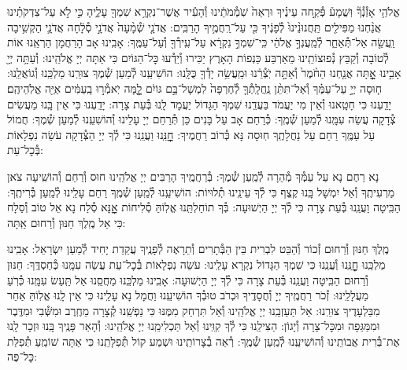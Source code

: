 \documentclass[twoside, openany, parskip=half, 11pt]{book}
\begin{document}
אֱלֹהַ֥י אָזְ֯נְ֯ךָ֘ וּֽשֲׁמָע֒ פְּ֯קַ֣חה עֵינֶ֗יךָ וּרְאֵה֙ שֹֽׁמְ֯מֹתֵ֔ינוּ וְ֯הָעִ֕יר אֲשֶׁר־נִקְרָ֥א שִׁמְךָ֖ עָלֶ֑יהָ כִּ֣י לֹ֣א עַל־צִדְקֹתֵ֗ינוּ אֲנַ֨חְנוּ מַפִּילִ֤ים תַּֽחֲנוּנֵ֨ינוּ֙ לְ֯פָנֶ֔יךָ כִּ֖י עַל־רַֽחֲמֶ֥יךָ הָרַבִּֽים: אֲדֹנָ֤י שְׁ֯מָ֨עָה֙ אֲדֹנָ֣י סְ֯לָ֔חָה אֲדֹנָ֛י הַקְשִׁ֥יבָה וַֽעֲשֵׂ֖ה אַל־תְּ֯אַחַ֑ר לְ֯מַֽעֲנְךָ֣ אֱלֹהַ֔י כִּֽי־שִׁמְךָ֣ נִקְרָ֔א עַל־עִֽירְ֯ךָ֖ וְ֯עַל־עַמֶּֽךָ: אָבִֽינוּ אָב הָרַחֲמָן הַרְאֵֽנוּ אוֹת לְ֯טוֹבָה וְ֯קַבֵּץ נְ֯פוּצוֹתֵֽינוּ מֵאַרְבַּע כַּנְפוֹת הָאָרֶץ יַכִּירוּ וְ֯יֵדְ֯עוּ כׇּל־הַגּוֹיִם כִּי אַתָּה יְיָ אֱלֹהֵֽינוּ:
וְ֯עַתָּ֥ה יְיָ֖ אָבִ֣ינוּ אׇׇׇׇׇׇֽתָּה אֲנַ֤חְנוּ הַחֹ֨מֶר֙ וְ֯אַתָּ֣ה יֹֽצְ֯רֵ֔נוּ וּמַֽעֲשֵׂ֥ה יָדְ֯ךָ֖ כֻּלָּֽנוּ: הוֹשִׁיעֵֽנוּ לְ֯מַעַן שְׁ֯מֶךָ צוּרֵֽנוּ מַלְכֵּֽנוּ וְ֯גוֹאֲלֵֽנוּ:
ח֧וּסָה יְיָ֣ עַל־עַמֶּ֗ךָ וְ֯אַל־תִּתֵּ֨ן נַֽחֲלָֽתְ֯ךָ֤ לְ֯חֶרְפָּה֙ לִמְשָׁל־בָּ֣ם גּוֹיִ֔ם לׇׇׇׇ֚מָּה יֹֽאמְ֯ר֣וּ בָֽעַמִּ֔ים אַיֵּ֖ה אֱלֹֽהֵיהֶֽם׃ יָדַֽעְנוּ כִּי חָטָֽאנוּ וְ֯אֵין מִי יַעֲמֹד בַּעֲדֵֽנוּ שִׁמְךָ הַגָּדוֹל יַעֲמָד לָֽנוּ בְּ֯עֵת צָרָה: יָדַֽעְנוּ כִּי אֵין בָּֽנוּ מַעֲשִׂים צְ֯דָקָה עֲשֵׂה עִמָּֽנוּ לְ֯מַעַן שְׁ֯מֶֽךָ: כְּ֯רַחֵם אָב עַל בָּנִים כֵּן תְּ֯רַחֵם יְיָ עָלֵינוּ וְ֯הוֹשִׁעֵֽנוּ לְ֯מַעַן שְׁ֯מֶךָ: חֲמוֹל עַל עַמֶּֽךָ רַחֵם עַל נַחֲלָתֶֽךָ חֽוּסָה נָּא כְּ֯רוֹב רַחֲמֶיךָ: חׇׇׇׇׇׇׇׇנֵּֽנוּ וַעֲנֵֽנוּ כִּי לְ֯ךָ יְיָ הַצְּ֯דָקָה עֹשֵׂה נִפְלָאוֹת בְּ֯כׇל־עֵת:



נָא רַחֶם נָא עַל עַמְּ֯ךָ מְ֯הֵרָה לְ֯מַֽעַן שְׁ֯מֶךָ: בְּ֯רַחֲמֶֽיךָ הָרַבִּים יְיָ אֱלֹהֵֽינוּ חוּס וְ֯רַחֵם וְ֯הוֹשִֽׁיעָה צֹאן מַרְעִיתֶֽךָ וְ֯אַל יִמְשָׁל בָּֽנוּ קֶֽצֶף כִּי לְ֯ךָ עֵינֵֽינוּ תְ֯לוּיוֹת: הוֹשִׁיעֵֽנוּ לְ֯מַֽעַן שְׁ֯מֶֽךָ רַחֵם עָלֵֽינוּ לְ֯מַֽעַן בְּ֯רִיתֶֽךָ: הַבִּֽיטָה וַעֲנֵֽנוּ בְּ֯עֵת צָרָה כִּי לְ֯ךָ יְיָ הַיְשׁוּעָה: בְּ֯ךָ תוֹחַלְתֵּֽנוּ אֱלֽוֹהַּ סְ֯לִיחוֹת אׇׇׇׇנָּא סְ֯לַח נָא אֵל טוֹב וְ֯סַלָח כִּי אֵל מֶֽלֶךְ חַנּוּן וְ֯רַחוּם אַֽתָּה:

מֶֽלֶךְ חַנּוּן וְ֯רַחוּם זְ֯כוֹר וְ֯הַבֵּט לִבְרִית בֵּין הַבְּ֯תָרִים וְ֯תֵרָאֶה לְ֯פָנֶֽיךָ עֲקֵדַת יָחִיד לְ֯מַעַן יִשְׂרָאֵל: אָבִֽינוּ מַלְכֵּֽנוּ חׇׇׇׇׇׇׇׇנֵּֽנוּ וְ֯עֲנֵֽנוּ כִּי שִׁמְךָ הַגָּדוֹל נִקְרָא עָלֵֽינוּ: עֹשֵׂה נִפְלָאוֹת בְּ֯כׇל־עֵת עֲשֵׂה עִמָּֽנוּ כְּ֯חַסְדֶּֽךָ: חַנּוּן וְ֯רַחוּם הַבִּֽיטָה וַעֲנֵֽנוּ בְּ֯עֵת צָרָה כִּי לְ֯ךָ יְיָ הַיְשׁוּעָה: אָבִֽינוּ מַלְכֵּֽנוּ מַחֲסֵֽנוּ אַל תַּֽעַשׂ עִמָּֽנוּ כְּ֯רֹֽעַ מַעֲלָלֵֽינוּ: זְ֯כֹר רַחֲמֶֽיךָ יְיָ וְ֯חֲסָדֶֽיךָ וּכְרֹב טוּבְ֯ךָ הוֹשִׁיעֵֽנוּ וַחֲמָל נָא עָלֵֽינוּ כִּי אֵין לָֽנוּ אֱלֽוֹהַּ אַחֵר מִבַּלְעָדֶיךָ צוּרֵֽנוּ: אַל תַּעַזְבֵֽנוּ יְיָ אֱלֹהֵֽינוּ וְ֯אַל תִּרְחַק מִמֶּנּוּ כִּי נַפְשֵֽׁנוּ קְ֯צָרָה מֵחֶֽרֶב וּמִשְּׁ֯בִי וּמִדֶּֽבֶר וּמִמַּגֵּפָה וּמִכׇּל־צָרָה וְ֯יָגוֹן: הַצִּילֵֽנוּ כִּי לְ֯ךָ קִוִּֽינוּ וְ֯אַל תַּכְלִימֵֽנוּ יְיָ אֱלֹהֵֽינוּ: וְ֯הָאֵר פָּנֶֽיךָ בָּֽנוּ וּזְכָר לָֽנוּ אֶת־בְּ֯רִית אֲבוֹתֵֽינוּ וְ֯הוֹשִׁיעֵֽנוּ לְ֯מַֽעַן שְׁ֯מֶֽךָ: רְ֯אֵה בְ֯צָרוֹתֵֽינוּ וּשְׁמַע קוֹל תְּ֯פִלָּתֵֽנוּ כִּי אַתָּה שׁוֹמֵֽעַ תְּ֯פִלַּת כׇּל־פֶּה:
\end{document}

